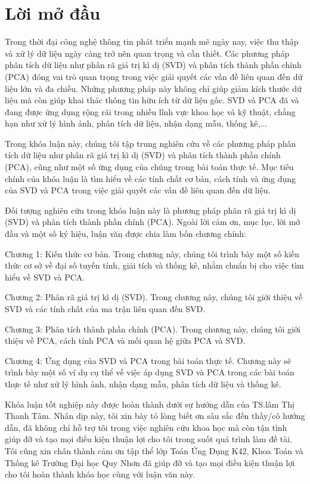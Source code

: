 \documentclass[12pt,a4paper,oneside]{report}
\numberwithin{equation}{section}
\begin{document}
\chapter*{Lời mở đầu}

\begin{justify}   
Trong thời đại công nghệ thông tin phát triển mạnh mẽ ngày nay, việc thu thập và xử lý dữ liệu ngày càng trở nên quan trọng và cần thiết. Các phương pháp phân tích dữ liệu như phân rã giá trị kì dị (SVD) và phân tích thành phần chính (PCA) đóng vai trò quan trọng trong việc giải quyết các vấn đề liên quan đến dữ liệu lớn và đa chiều. Những phương pháp này không chỉ giúp giảm kích thước dữ liệu mà còn giúp khai thác thông tin hữu ích từ dữ liệu gốc. SVD và PCA đã và đang được ứng dụng rộng rãi trong nhiều lĩnh vực khoa học và kỹ thuật, chẳng hạn như xử lý hình ảnh, phân tích dữ liệu, nhận dạng mẫu, thống kê,...

Trong khóa luận này, chúng tôi tập trung nghiên cứu về các phương pháp phân tích dữ liệu như phân rã giá trị kì dị (SVD) và phân tích thành phần chính (PCA), cũng như một số ứng dụng của chúng trong bài toán thực tế. Mục tiêu chính của khóa luận là tìm hiểu về các tính chất cơ bản, cách tính và ứng dụng của SVD và PCA trong việc giải quyết các vấn đề liên quan đến dữ liệu.

Đối tượng nghiên cứu trong khóa luận này là phương pháp phân rã giá trị kì dị (SVD) và phân tích thành phần chính (PCA). Ngoài lời cảm ơn, mục lục, lời mở đầu và một số ký hiệu, luận văn được chia làm bốn chương chính:

Chương 1: Kiến thức cơ bản. Trong chương này, chúng tôi trình bày một số kiến thức cơ sở về đại số tuyến tính, giải tích và thống kê, nhằm chuẩn bị cho việc tìm hiểu về SVD và PCA.

Chương 2: Phân rã giá trị kì dị (SVD). Trong chương này, chúng tôi giới thiệu về SVD và các tính chất của ma trận liên quan đến SVD.

Chương 3: Phân tích thành phần chính (PCA). Trong chương này, chúng tôi giới thiệu về PCA, cách tính PCA và mối quan hệ giữa PCA và SVD.

Chương 4: Ứng dụng của SVD và PCA trong bài toán thực tế. Chương này sẽ trình bày một số ví dụ cụ thể về việc áp dụng SVD và PCA trong các bài toán thực tế như xử lý hình ảnh, nhận dạng mẫu, phân tích dữ liệu và thống kê.

Khóa luận tốt nghiệp này được hoàn thành dưới sự hướng dẫn của TS.lâm Thị Thanh Tâm. Nhân dịp này, tôi xin bày tỏ lòng biết ơn sâu sắc đến thầy/cô hướng dẫn, đã không chỉ hỗ trợ tôi trong việc nghiên cứu khoa học mà còn tận tình giúp đỡ và tạo mọi điều kiện thuận lợi cho tôi trong suốt quá trình làm đề tài. Tôi cũng xin chân thành cảm ơn tập thể lớp Toán Ứng Dụng K42, Khoa Toán và Thống kê Trường Đại học Quy Nhơn đã giúp đỡ và tạo mọi điều kiện thuận lợi cho tôi hoàn thành khóa học cùng với luận văn này.


\end{justify}
\end{document}
